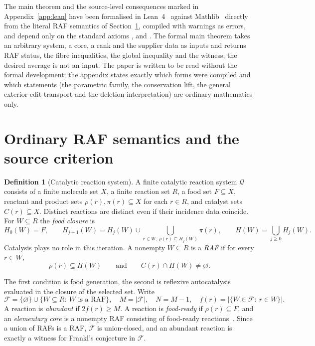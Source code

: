 \documentclass[11pt,a4paper]{article}
\theoremstyle{plain}
\theoremstyle{definition}
\newtheorem{definition}[theorem]{Definition}
\theoremstyle{remark}
\newcommand{\FF}{\mathcal F}
\newcommand{\QQ}{\mathcal Q}
\begin{document}
The main theorem and the source-level consequences marked in Appendix~\ref{app:lean} have been formalised in Lean~4~\cite{demoura2021lean} against Mathlib~\cite{mathlib2020} directly from the literal RAF semantics of Section~\ref{sec:prelim}, compiled with warnings as errors, and depend only on the standard axioms ,  and . The formal main theorem takes an arbitrary system, a core, a rank and the supplier data as inputs and returns RAF status, the fibre inequalities, the global inequality and the witness; the desired average is not an input. The paper is written to be read without the formal development; the appendix states exactly which forms were compiled and which statements (the parametric family, the conservation lift, the general exterior-edit transport and the deletion interpretation) are ordinary mathematics only.

\section{Ordinary RAF semantics and the source criterion}\label{sec:prelim}

\begin{definition}[Catalytic reaction system]\label{def:crs}
A finite catalytic reaction system $\QQ$ consists of a finite molecule set $X$, a finite reaction set $R$, a food set $F\subseteq X$, reactant and product sets $\rho(r),\pi(r)\subseteq X$ for each $r\in R$, and catalyst sets $C(r)\subseteq X$. Distinct reactions are distinct even if their incidence data coincide. For $W\subseteq R$ the \emph{food closure} is
\[
 H_0(W)=F,\qquad
 H_{j+1}(W)=H_j(W)\cup\bigcup_{r\in W,\ \rho(r)\subseteq H_j(W)}\pi(r),
 \qquad H(W)=\bigcup_{j\ge0}H_j(W).
\]
Catalysis plays no role in this iteration. A nonempty $W\subseteq R$ is a \emph{RAF} if for every $r\in W$,
\[
 \rho(r)\subseteq H(W)\qquad\text{and}\qquad C(r)\cap H(W)\ne\varnothing .
\]
\end{definition}

The first condition is food generation, the second is reflexive autocatalysis evaluated in the closure of the selected set. Write
\begin{equation}\label{eq:family}
 \FF=\{\varnothing\}\cup\{W\subseteq R:\ W\text{ is a RAF}\},\quad
 M=|\FF|,\quad N=M-1,\quad f(r)=|\{W\in\FF:\ r\in W\}| .
\end{equation}
A reaction is \emph{abundant} if $2f(r)\ge M$. A reaction is \emph{food-ready} if $\rho(r)\subseteq F$, and an \emph{elementary core} is a nonempty RAF consisting of food-ready reactions~\cite{elementary2026}. Since a union of RAFs is a RAF, $\FF$ is union-closed, and an abundant reaction is exactly a witness for Frankl's conjecture in $\FF$.
\end{document}
